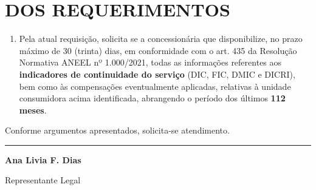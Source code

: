 \documentclass[11pt,a4paper]{article}
\begin{document}


\section{DOS REQUERIMENTOS}

\begin{enumerate}[resume]
\item Pela atual requisição, solicita se a concessionária que disponibilize, no prazo máximo de 30 (trinta) dias, em conformidade com o art. 435 da Resolução Normativa ANEEL nº 1.000/2021, todas as informações referentes aos \textbf{indicadores de continuidade do serviço} (DIC, FIC, DMIC e DICRI), bem como às compensações eventualmente aplicadas, relativas à unidade consumidora acima identificada, abrangendo o período dos últimos \textbf{112 meses}.
\end{enumerate}

Conforme argumentos apresentados, solicita-se atendimento.

\vspace{2cm}
\begin{center}
\noindent\rule{6cm}{0.4pt}

\textbf{Ana Livia F. Dias}

{\small Representante Legal}
\end{center}
\end{document}
